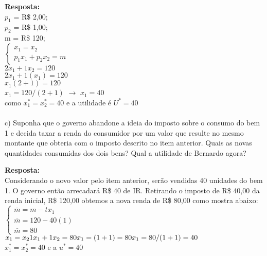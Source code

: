 \begin{enumerate}
\textbf{Resposta:}\\

{$p_1$ = R\$ 2,00};\\
{$p_2$ = R\$ 1,00};\\
m = R\$ 120;\\

{$\begin{cases} x_{1} = x_{2}\\
p_{1}x_{1}+p_{2}x_{2}=m
\end{cases}$}\\



{$2x_{1}+1x_{2} = 120$}\\
{$2x_{1}+1(x_{1}) = 120$}\\
{$x_1(2+1) = 120$}\\
{$x_1 = 120/(2+1)$} {$\rightarrow$} {$x_{1} = 40$}\\
como {$x_{1}^{*} = x_{2}^{*} = 40$} e a utilidade é {$U^{*} = 40$}


\paragraph{} c) Suponha que o governo abandone a ideia do imposto sobre o consumo do bem 1 e decida
taxar a renda do consumidor por um valor que resulte no mesmo montante que obteria com o imposto descrito no item anterior. Quais as novas quantidades consumidas dos dois bens? Qual a utilidade de Bernardo agora?

\textbf{Resposta:}\\

Considerando o novo valor pelo item anterior, serão vendidas 40 unidades do bem 1. O governo então arrecadará R\$ 40 de IR. Retirando o imposto de R\$ 40,00 da renda inicial, R\$ 120,00 obtemos a nova renda de R\$ 80,00 como mostra abaixo:\\

{$\begin{cases} \overline{m} = m-tx_{1}\\
\overline{m} = 120-40(1)\\
\overline{m} = 80
\end{cases}$}\\

{$x_{1}=x_{2}\\
1x_{1}+1x_{2} = 80\\
x_{1} = (1+1) = 80
x_1 = 80/(1+1) = 40$}\\
{$x_{1}^{*} = x_{2}^{*} = 40$} e a {$u^{*} = 40$}\\



\end{enumerate}
